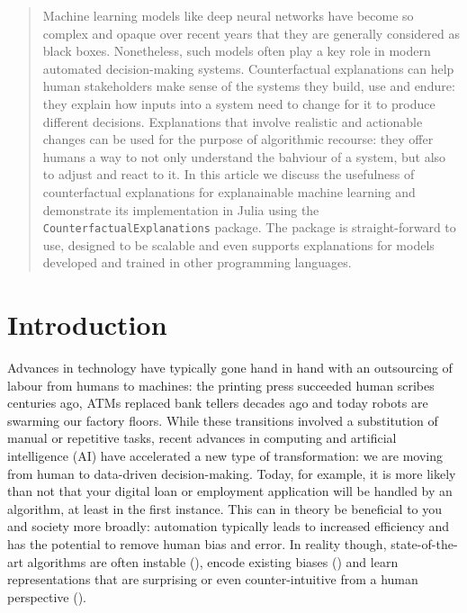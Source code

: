 \documentclass{juliacon}
\begin{document}


\maketitle

\begin{abstract}

Machine learning models like deep neural networks have become so complex and opaque over recent years that they are generally considered as black boxes. Nonetheless, such models often play a key role in modern automated decision-making systems. Counterfactual explanations can help human stakeholders make sense of the systems they build, use and endure: they explain how inputs into a system need to change for it to produce different decisions. Explanations that involve realistic and actionable changes can be used for the purpose of algorithmic recourse: they offer humans a way to not only understand the bahviour of a system, but also to adjust and react to it. In this article we discuss the usefulness of counterfactual explanations for explanainable machine learning and demonstrate its implementation in Julia using the \verb|CounterfactualExplanations| package. The package is straight-forward to use, designed to be scalable and even supports explanations for models developed and trained in other programming languages.

\end{abstract}

\hypertarget{sec-intro}{%
\section{Introduction}\label{sec-intro}}

Advances in technology have typically gone hand in hand with an
outsourcing of labour from humans to machines: the printing press
succeeded human scribes centuries ago, ATMs replaced bank tellers
decades ago and today robots are swarming our factory floors. While
these transitions involved a substitution of manual or repetitive tasks,
recent advances in computing and artificial intelligence (AI) have
accelerated a new type of transformation: we are moving from human to
data-driven decision-making. Today, for example, it is more likely than
not that your digital loan or employment application will be handled by
an algorithm, at least in the first instance. This can in theory be
beneficial to you and society more broadly: automation typically leads
to increased efficiency and has the potential to remove human bias and
error. In reality though, state-of-the-art algorithms are often instable
(\cite{goodfellow2014explaining}), encode existing biases
(\cite{buolamwini2018gender}) and learn representations that are
surprising or even counter-intuitive from a human perspective
(\cite{sturm2014simple}).
\end{document}
